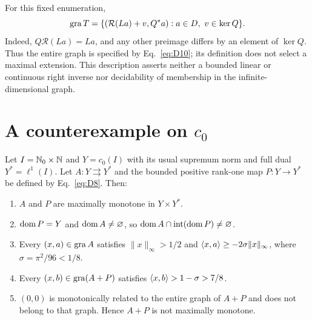 For this fixed enumeration,
\[
\operatorname{gra} T=\{(\mathcal R(La)+v,Q^*a):a\in D,\ v\in\ker Q\}.
\]
Indeed, $Q\mathcal R(La)=La$, and any other preimage differs by
an element of $\ker Q$. Thus the entire graph is specified by
Eq.~\eqref{eq:D10}; its definition does not select a maximal extension.
This description asserts neither a bounded linear or continuous right
inverse nor decidability of membership in the infinite-dimensional graph.

\section{A counterexample on $c_0$}
\label{sec:c0}
\label{sec:statements}
\renewcommand{\theexample}{C}
\begin{example}[$c_0$ realization]\label{thm:C}
Let $I=\mathbb N_0\times\mathbb N$ and $Y=c_0(I)$ with its usual supremum norm and
full dual $Y^*=\ell^1(I)$. Let $A:Y\rightrightarrows Y^*$ and the bounded
positive rank-one map $P:Y\to Y^*$ be defined by Eq.~\eqref{eq:D8}.
Then:
\begin{enumerate}
\item $A$ and $P$ are maximally monotone in $Y\times Y^*$.
\item $\operatorname{dom} P=Y$ and $\operatorname{dom} A\ne\varnothing$, so
$\operatorname{dom} A\cap\operatorname{int}(\operatorname{dom} P)\ne\varnothing$.
\item Every $(x,a)\in\operatorname{gra} A$ satisfies $\|x\|_\infty>1/2$ and
$\langle x,a\rangle\ge-2\sigma\|x\|_\infty$, where $\sigma=\pi^2/96<1/8$.
\item Every $(x,b)\in\operatorname{gra}(A+P)$ satisfies
$\langle x,b\rangle>1-\sigma>7/8$.
\item $(0,0)$ is monotonically related to the entire graph of $A+P$ and
does not belong to that graph. Hence $A+P$ is not maximally monotone.
\end{enumerate}
\end{example}
